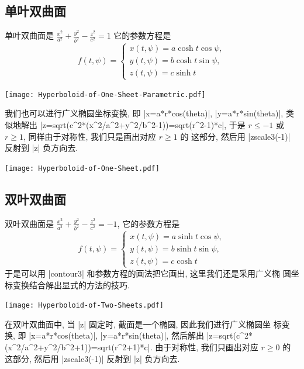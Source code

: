 \documentclass{ctexbook}
\let\leq\leqslant
\let\geq\geqslant
\begin{document}
\subsection{单叶双曲面}
单叶双曲面是
$\frac{x^{2}}{a^{2}}+\frac{y^{2}}{b^{2}}-\frac{z^{2}}{c^{2}}=1$
它的参数方程是
\begin{equation}
  f(t,\psi)=\left\{
    \begin{array}{ll}
      x(t,\psi)=a\cosh t\cos\psi,\\
      y(t,\psi)=b\cosh t\sin\psi,\\
      z(t,\psi)=c\sinh t
    \end{array}\right.
\end{equation}
\begin{center}\texttt{[image: Hyperboloid-of-One-Sheet-Parametric.pdf]}\end{center}%

我们也可以进行广义椭圆坐标变换, 即 |x=a*r*cos(theta)|, |y=a*r*sin(theta)|,
类似地解出
|z=sqrt(c^2*(x^2/a^2+y^2/b^2-1))=sqrt(r^2-1)*c|, 于是
$r\leq -1$ 或 $r\geq 1$, 同样由于对称性, 我们只是画出对应 $r\geq 1$ 的
这部分, 然后用 |zscale3(-1)| 反射到 |z| 负方向去.
\begin{center}\texttt{[image: Hyperboloid-of-One-Sheet.pdf]}\end{center}%


\subsection{双叶双曲面}
双叶双曲面是
$\frac{x^{2}}{a^{2}}+\frac{y^{2}}{b^{2}}-\frac{z^{2}}{c^{2}}=-1$,
它的参数方程是
\begin{equation}
  f(t,\psi)=\left\{
    \begin{array}{ll}
      x(t,\psi)=a\sinh t\cos\psi,\\
      y(t,\psi)=b\sinh t\sin\psi,\\
      z(t,\psi)=c\cosh t
    \end{array}\right.
\end{equation}
于是可以用 |contour3| 和参数方程的画法把它画出, 这里我们还是采用广义椭
圆坐标变换结合解出显式的方法的技巧.
\begin{center}\texttt{[image: Hyperboloid-of-Two-Sheets.pdf]}\end{center}%

在双叶双曲面中, 当 |z| 固定时, 截面是一个椭圆, 因此我们进行广义椭圆坐
标变换, 即 |x=a*r*cos(theta)|, |y=a*r*sin(theta)|, 然后解出
|z=sqrt(c^2*(x^2/a^2+y^2/b^2+1))=sqrt(r^2+1)*c|. 由于对称性, 我们只画出对应 $r\geq 0$ 的
这部分, 然后用 |zscale3(-1)| 反射到 |z| 负方向去.
\end{document}
